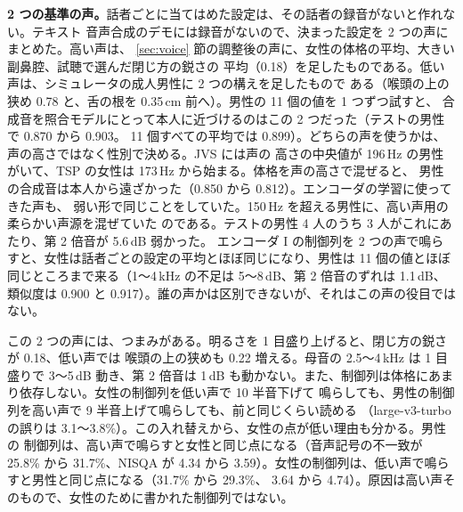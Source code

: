 \documentclass[10pt,a4paper,twocolumn]{article}
\begin{document}
\textbf{2 つの基準の声。}話者ごとに当てはめた設定は、その話者の録音がないと作れない。テキスト
音声合成のデモには録音がないので、決まった設定を 2 つの声にまとめた。高い声は、
\ref{sec:voice} 節の調整後の声に、女性の体格の平均、大きい副鼻腔、試聴で選んだ閉じ方の鋭さの
平均（0.18）を足したものである。低い声は、シミュレータの成人男性に 2 つの構えを足したもので
ある（喉頭の上の狭め 0.78 と、舌の根を 0.35\,cm 前へ）。男性の 11 個の値を 1 つずつ試すと、
合成音を照合モデルにとって本人に近づけるのはこの 2 つだった（テストの男性で 0.870 から 0.903。
11 個すべての平均では 0.899）。どちらの声を使うかは、声の高さではなく性別で決める。JVS には声の
高さの中央値が 196\,Hz の男性がいて、TSP の女性は 173\,Hz から始まる。体格を声の高さで混ぜると、
男性の合成音は本人から遠ざかった（0.850 から 0.812）。エンコーダの学習に使ってきた声も、
弱い形で同じことをしていた。150\,Hz を超える男性に、高い声用の柔らかい声源を混ぜていた
のである。テストの男性 4 人のうち 3 人がこれにあたり、第 2 倍音が 5.6\,dB 弱かった。
エンコーダ I の制御列を 2 つの声で鳴らすと、女性は話者ごとの設定の平均とほぼ同じになり、男性は
11 個の値とほぼ同じところまで来る（1〜4\,kHz の不足は 5〜8\,dB、第 2 倍音のずれは 1.1\,dB、
類似度は 0.900 と 0.917）。誰の声かは区別できないが、それはこの声の役目ではない。

この 2 つの声には、つまみがある。明るさを 1 目盛り上げると、閉じ方の鋭さが 0.18、低い声では
喉頭の上の狭めも 0.22 増える。母音の 2.5〜4\,kHz は 1 目盛りで 3〜5\,dB 動き、第 2 倍音は
1\,dB も動かない。また、制御列は体格にあまり依存しない。女性の制御列を低い声で 10 半音下げて
鳴らしても、男性の制御列を高い声で 9 半音上げて鳴らしても、前と同じくらい読める
（large-v3-turbo の誤りは 3.1〜3.8\%）。この入れ替えから、女性の点が低い理由も分かる。男性の
制御列は、高い声で鳴らすと女性と同じ点になる（音声記号の不一致が 25.8\% から 31.7\%、NISQA が
4.34 から 3.59）。女性の制御列は、低い声で鳴らすと男性と同じ点になる（31.7\% から 29.3\%、
3.64 から 4.74）。原因は高い声そのもので、女性のために書かれた制御列ではない。
\end{document}
